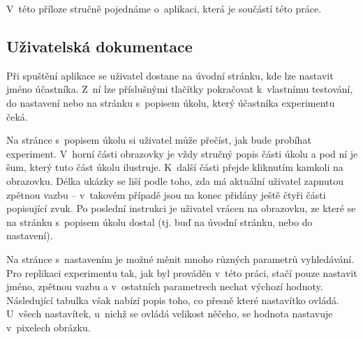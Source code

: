 \newpage
{}

V~této příloze stručně pojednáme o~aplikaci, která je součástí této práce. 

\subsection*{Uživatelská dokumentace}

Při spuštění aplikace se uživatel dostane na úvodní stránku, kde lze nastavit
jméno účastníka. Z~ní lze příslušnými tlačítky pokračovat k~vlastnímu
testování, do nastavení nebo na stránku s~popisem úkolu, který účastníka
experimentu čeká.

Na stránce s~popisem úkolu si uživatel může přečíst, jak bude probíhat experiment. V~horní části
obrazovky je vždy stručný popis části úkolu a pod ní je šum, který tuto část
úkolu ilustruje. K~další části přejde kliknutím kamkoli na obrazovku. Délka
ukázky se liší podle toho, zda má aktuální uživatel zapnutou zpětnou vazbu --
v~takovém případě jsou na konec přidány ještě čtyři části popisující zvuk. Po
poslední instrukci je uživatel vrácen na obrazovku, ze které se na stránku
s~popisem úkolu dostal (tj. buď na úvodní stránku, nebo do nastavení).

Na stránce s~nastavením je možné měnit mnoho různých parametrů vyhledávání. Pro
replikaci experimentu tak, jak byl prováděn v~této práci, stačí pouze nastavit
jméno, zpětnou vazbu a v~ostatních parametrech nechat výchozí hodnoty.
Následující tabulka však nabízí popis toho, co přesně které nastavítko ovládá.
U~všech nastavítek, u~nichž se ovládá velikost něčeho,
se hodnota nastavuje v~pixelech obrázku.
\bigskip

